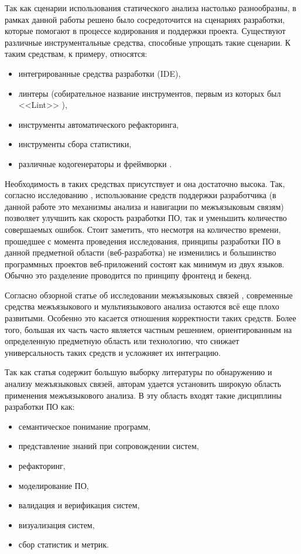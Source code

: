 Так как сценарии использования статического анализа настолько разнообразны, в рамках данной работы
решено было сосредоточится на сценариях разработки, которые помогают в процессе кодирования и поддержки проекта.
Существуют различные инструментальные средства, способные упрощать такие сценарии.
К таким средствам, к примеру, относятся:
\begin{itemize}
    \item интегрированные средства разработки (IDE),
    \item линтеры (собирательное название инструментов, первым из которых был <<Lint>> \cite{Johnson1978LintAC}),
    \item инструменты автоматического рефакторинга,
    \item инструменты сбора статистики,
    \item различные кодогенераторы и фреймворки \cite{qt-moc}\cite{react}.
\end{itemize}

Необходимость в таких средствах присутствует и она достаточно высока. Так, согласно
исследованию \cite{aid-developers}, использование средств поддержки разработчика
(в данной работе это механизмы анализа и навигации по межъязыковым связям) позволяет
улучшить как скорость разработки ПО, так и уменьшить количество совершаемых ошибок. Стоит заметить,
что несмотря на количество времени, прошедшее с момента проведения исследования, 
принципы разработки ПО в данной предметной области (веб-разработка) не изменились и большинство
программных проектов веб-приложений состоят как минимум из двух языков. 
Обычно это разделение проводится по принципу фронтенд и бекенд.

Согласно обзорной статье об исследовании межъязыковых связей \cite{pragmatic-evidence}, современные средства межъязыкового
и мультиязыкового анализа остаются всё еще плохо развитыми. Особенно это касается отношения корректности
таких средств. Более того, большая их часть часто является частным решением, ориентированным на определенную
предметную область или технологию, что снижает универсальность таких средств и усложняет их интеграцию.

Так как статья содержит большую выборку литературы по обнаружению и анализу межъязыковых связей, авторам удается
установить широкую область применения межъязыкового анализа. В эту область входят такие дисциплины разработки ПО как:
\begin{itemize}
    \item семантическое понимание программ,
    \item представление знаний при сопровождении систем,
    \item рефакторинг,
    \item моделирование ПО,
    \item валидация и верификация систем,
    \item визуализация систем,
    \item сбор статистик и метрик.
\end{itemize}

